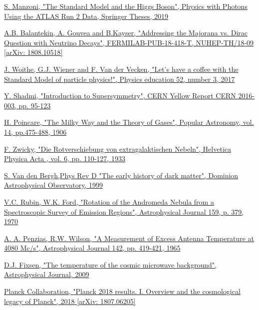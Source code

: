\documentclass[a4paper, 10pt, openright]{report}
\begin{document}
\begin{thebibliography}{1}
\href{https://link.springer.com/chapter/10.1007/978-3-030-24370-8_2#citeas}{S. Manzoni, 
"The Standard Model and the Higgs Boson",
Physics with Photons Using the ATLAS Run 2 Data, Springer Theses, 2019
}

\href{https://arxiv.org/abs/1808.10518}{A.B. Balantekin, A. Gouvea and B.Kayser,
"Addressing the Majorana vs. Dirac Question with Neutrino Decays",
FERMILAB-PUB-18-418-T, NUHEP-TH/18-09 [arXiv: 1808.10518]
}

\href{https://arxiv.org/abs/1808.10518}{J. Woithe, G.J. Wiener and F. Van der Vecken,
"Let's have a coffee with the Standard Model of particle physics!",
Physics education 52, number 3, 2017
}

\href{https://arxiv.org/abs/1708.00772}{Y. Shadmi,
"Introduction to Supersymmetry",
CERN Yellow Report CERN 2016-003, pp. 95-123}

\href{http://adsabs.harvard.edu/full/1906PA.....14..475P}{H. Poincare,
"The Milky Way and the Theory of Gases",
Popular Astronomy, vol. 14, pp.475-488, 1906}

\href{http://articles.adsabs.harvard.edu/cgi-bin/nph-iarticle_query?1933AcHPh...6..110Z&amp;data_type=PDF_HIGH&amp;whole_paper=YES&amp;type=PRINTER&amp;filetype=.pdf}{
F. Zwicky,
"Die Rotverschiebung von extragalaktischen Nebeln",
Helvetica Physica Acta , vol. 6, pp. 110-127, 1933}

\href{https://arxiv.org/pdf/astro-ph/9904251.pdf}{S. Van den Bergh,Phys Rev D
"The early history of dark matter",
Dominion Astrophysical Observatory, 1999
}

\href{https://ui.adsabs.harvard.edu/abs/1970ApJ...159..379R/abstract}{V.C. Rubin, W.K. Ford,
"Rotation of the Andromeda Nebula from a Spectroscopic Survey of Emission Regions",
Astrophysical Journal 159, p. 379, 1970
}

\href{https://ui.adsabs.harvard.edu/abs/1965ApJ...142..419P/abstract}{A. A. Penzias, R.W. Wilson,
"A Measurement of Excess Antenna Temperature at 4080 Mc/s",
Astrophysical Journal 142, pp. 419-421, 1965
}

\href{https://iopscience.iop.org/article/10.1088/0004-637X/707/2/916}{D.J. Fixsen,
"The temperature of the cosmic microwave background",
Astrophysical Journal, 2009
}

\href{https://arxiv.org/abs/1807.06205}{Planck Collaboration, 
"Planck 2018 results. I. Overview and the cosmological legacy of Planck", 2018 [arXiv: 1807.06205]
}



\end{thebibliography}
\end{document}
